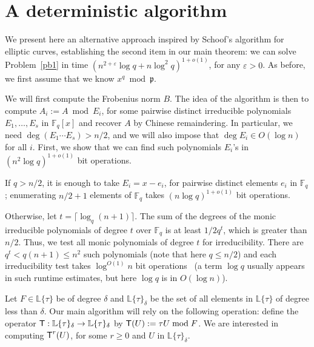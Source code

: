 \documentclass[sigconf]{acmart}
\newcommand{\F}{\mathbb{F}}
\renewcommand{\L}{\mathbb{L}}
\newcommand{\ang}[1]{\{#1\}}
\newcommand{\frakp}{\mathfrak{p}}
\begin{document}

\section{A deterministic algorithm}\label{sec:schoof}

We present here an alternative approach inspired by Schoof's algorithm
for elliptic curves, establishing the second item in our main theorem:
we can solve Problem~\ref{pb1} in time $(n^{2+\varepsilon} \log q + n
\log^2 q)^{1+o(1)}$, for any $\varepsilon > 0$. As before, we first assume 
that we know $x^q \bmod \frakp$.

\smallskip{} We will first compute the Frobenius norm
$B$. The idea of the algorithm is then to compute $A_i:=A \bmod E_i$, for
some pairwise distinct irreducible polynomials $E_1,\dots,E_s$ in
$\F_q[x]$ and recover $A$ by Chinese remaindering.  In particular, we
need $\deg(E_1 \cdots E_s) > n/2$, and we will also impose that $\deg
E_i \in O(\log n)$ for all $i$. First, we show that we can find such
polynomials $E_i$'s in $(n^2 \log q)^{1+o(1)}$ bit operations.

If $q > n/2$, it is enough to take $E_i = x-e_i$, for pairwise
distinct elements $e_i$ in $\F_q$; enumerating $n/2+1$ elements of
$\F_q$ takes $(n \log q)^{1+o(1)}$ bit operations.

Otherwise, let $t= \lceil \log_q (n+1)\rceil$. The sum of the degrees
of the monic irreducible polynomials of degree $t$ over $\F_q$ is at
least $1/2 q^t$, which is greater than $n/2$. Thus, we test all monic
polynomials of degree $t$ for irreducibility. There are $q^t < q(n+1)
\le n^2$ such polynomials (note that here $q \le n/2$) and each
irreducibility test takes $\log^{O(1)} n$ bit
operations~\cite{vonzurGathen1992} (a term $\log q$ usually appears in
such runtime estimates, but here $\log q$ is in $O(\log n)$).

\smallskip{} Let $F \in\L\ang{\tau}$ be of degree
$\delta$ and $\L\ang{\tau}_{\delta}$ be the set of all elements in
$\L\ang{\tau}$ of degree less than $\delta$. Our main algorithm will
rely on the following operation: define the operator $\text{\sf
  T}:\L\ang{\tau}_{\delta} \to \L\ang{\tau}_{\delta}$ by $\text{\sf
  T}(U) := \tau U \bmod F$.  We are interested in computing $\text{\sf
  T}^r(U)$, for some $r \ge 0$ and $U$ in
$\L\ang{\tau}_{\delta}$.
\end{document}
